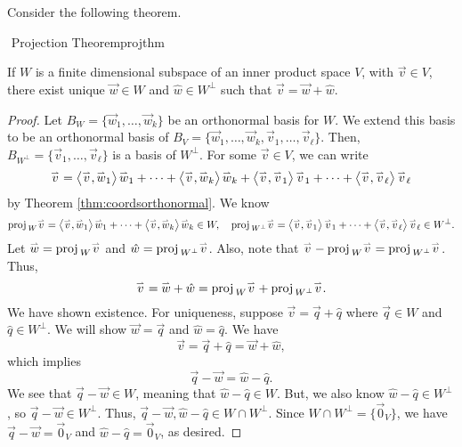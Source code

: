         \pagebreak
        \vphantom
        \\
        \\
        Consider the following theorem.
        \begin{theorem}{\Stop\,\,Projection Theorem}{projthm}

            If \(W\) is a finite dimensional subspace of an inner product space \(V\), with \(\vec{v}\in V\), there exist unique \(\vec{w}\in W\) and \(\hat{w}\in W^\perp\) such that \(\vec{v}=\vec{w}+\hat{w}\).
            \begin{proof}
                Let \(B_W=\{\vec{w}_1,\ldots,\vec{w}_k\}\) be an orthonormal basis for \(W\). We extend this basis to be an orthonormal basis of \(B_V=\{\vec{w}_1,\ldots,\vec{w}_k,\vec{v}_1,\ldots,\vec{v}_\ell\}\). Then, \(B_{W^\perp}=\{\vec{v}_1,\ldots,\vec{v}_\ell\}\) is a basis of \(W^\perp\). For some \(\vec{v}\in V\), we can write
                \begin{equation*}
                    \overset{_{\rightharpoonup}}{v}=\left\langle \overset{_{\rightharpoonup}}{v},\overset{_{\rightharpoonup}}{w}_1\right\rangle\overset{_{\rightharpoonup}}{w}_1+\cdots+\left\langle \overset{_{\rightharpoonup}}{v},\overset{_{\rightharpoonup}}{w}_k\right\rangle\overset{_{\rightharpoonup}}{w}_k+\left\langle \overset{_{\rightharpoonup}}{v},\overset{_{\rightharpoonup}}{v}_1\right\rangle\overset{_{\rightharpoonup}}{v}_1+\cdots+\left\langle \overset{_{\rightharpoonup}}{v},\overset{_{\rightharpoonup}}{v}_\ell\right\rangle\overset{_{\rightharpoonup}}{v}_\ell
                \end{equation*}
                by Theorem \ref{thm:coordsorthonormal}. We know
                \begin{equation*}
                    \text{proj\,}_W\overset{_{\rightharpoonup}}{v}=\left\langle \overset{_{\rightharpoonup}}{v},\overset{_{\rightharpoonup}}{w}_1\right\rangle\overset{_{\rightharpoonup}}{w}_1+\cdots+\left\langle \overset{_{\rightharpoonup}}{v},\overset{_{\rightharpoonup}}{w}_k\right\rangle\overset{_{\rightharpoonup}}{w}_k\in W,\quad \text{proj\,}_{W^\perp}\overset{_{\rightharpoonup}}{v}=\left\langle \overset{_{\rightharpoonup}}{v},\overset{_{\rightharpoonup}}{v}_1\right\rangle\overset{_{\rightharpoonup}}{v}_1+\cdots+\left\langle \overset{_{\rightharpoonup}}{v},\overset{_{\rightharpoonup}}{v}_\ell\right\rangle\overset{_{\rightharpoonup}}{v}_\ell\in W^\perp.
                \end{equation*}
                Let \(\overset{_{\rightharpoonup}}{w}=\text{proj\,}_W\overset{_{\rightharpoonup}}{v}\) and \(\hat{w}=\text{proj\,}_{W^\perp}\overset{_{\rightharpoonup}}{v}\). Also, note that \(\overset{_{\rightharpoonup}}{v}-\text{proj\,}_W\overset{_{\rightharpoonup}}{v}=\text{proj\,}_{W^\perp}\overset{_{\rightharpoonup}}{v}\). Thus,
                \begin{equation*}
                    \overset{_{\rightharpoonup}}{v}=\overset{_{\rightharpoonup}}{w}+\hat{w}=\text{proj\,}_W\overset{_{\rightharpoonup}}{v}+\text{proj\,}_{W^\perp}\overset{_{\rightharpoonup}}{v}.
                \end{equation*}
                We have shown existence. For uniqueness, suppose \(\vec{v}=\vec{q}+\hat{q}\) where \(\vec{q}\in W\) and \(\hat{q}\in W^\perp\). We will show \(\vec{w}=\vec{q}\) and \(\hat{w}=\hat{q}\). We have
                \begin{equation*}
                    \vec{v}=\vec{q}+\hat{q}=\vec{w}+\hat{w},
                \end{equation*}
                which implies
                \begin{equation*}
                    \vec{q}-\vec{w}=\hat{w}-\hat{q}.
                \end{equation*}
                We see that \(\vec{q}-\vec{w}\in W\), meaning that \(\hat{w}-\hat{q}\in W\). But, we also know \(\hat{w}-\hat{q}\in W^\perp\), so \(\vec{q}-\vec{w}\in W^\perp\). Thus, \(\vec{q}-\vec{w},\hat{w}-\hat{q}\in W\cap W^\perp\). Since \(W\cap W^\perp=\{\vec{0}_V\}\), we have \(\vec{q}-\vec{w}=\vec{0}_V\) and \(\hat{w}-\hat{q}=\vec{0}_V\), as desired.
            \end{proof}
            
        \end{theorem}
